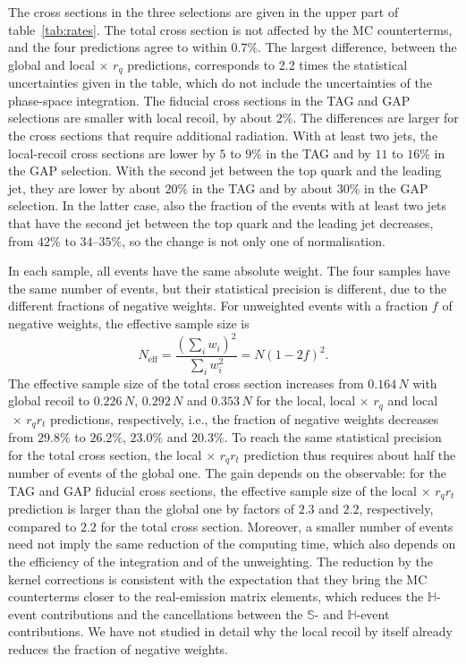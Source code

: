 \documentclass[a4paper,11pt]{article}
\newcommand{\clS}{\mathbb{S}}
\newcommand{\clH}{\mathbb{H}}
\newcommand{\glob}{global\xspace}
\newcommand{\loc}{local\xspace}
\newcommand{\locq}{local$\,{\times}\,r_q$\xspace}
\newcommand{\locqt}{local$\,{\times}\,r_qr_t$\xspace}
\begin{document}
The cross sections in the three selections are given in the upper part
of table~\ref{tab:rates}. The total cross section is not affected by
the MC counterterms, and the four predictions agree to within $0.7\%$.
The largest difference, between the \glob and \locq predictions,
corresponds to 2.2 times the statistical uncertainties given in the
table, which do not include the uncertainties of the phase-space
integration. The fiducial cross sections in the TAG and GAP selections
are smaller with local recoil, by about $2\%$. The differences are
larger for the cross sections that require additional radiation. With
at least two jets, the local-recoil cross sections are lower by $5$ to
$9\%$ in the TAG and by $11$ to $16\%$ in the GAP selection. With the
second jet between the top quark and the leading jet, they are lower
by about $20\%$ in the TAG and by about $30\%$ in the GAP selection.
In the latter case, also the fraction of the events with at least two
jets that have the second jet between the top quark and the leading
jet decreases, from $42\%$ to $34$--$35\%$, so the change is not only
one of normalisation.

In each sample, all events have the same absolute weight. The four
samples have the same number of events, but their statistical
precision is different, due to the different fractions of negative
weights. For unweighted events with a
fraction $f$ of negative weights, the effective sample size is
\begin{equation}
  N_{\mathrm{eff}}=\frac{\left(\sum_iw_i\right)^2}{\sum_iw_i^2}=N\left(1-2f\right)^2.
  \label{eq:neff}
\end{equation}
The effective sample size of the total cross section increases from
$0.164\,N$ with global recoil to $0.226\,N$, $0.292\,N$ and $0.353\,N$
for the \loc, \locq and \locqt predictions, respectively, i.e., the
fraction of negative weights decreases from $29.8\%$ to $26.2\%$,
$23.0\%$ and $20.3\%$. To reach the same statistical precision for the
total cross section, the \locqt prediction thus requires about half
the number of events of the \glob one. The gain depends on the
observable: for the TAG and GAP fiducial cross sections, the effective
sample size of the \locqt prediction is larger than the \glob one by
factors of $2.3$ and $2.2$, respectively, compared to $2.2$ for the
total cross section. Moreover, a smaller number of events need not
imply the same reduction of the computing time, which also depends on
the efficiency of the integration and of the unweighting. The
reduction by the kernel corrections is consistent with
the expectation that they bring the MC counterterms closer to the
real-emission matrix elements, which reduces the $\clH$-event
contributions and the cancellations between the $\clS$- and
$\clH$-event contributions. We have not studied in detail why the
local recoil by itself already reduces the fraction of negative
weights.
\end{document}

